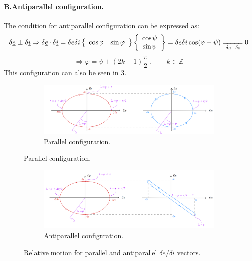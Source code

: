 			\paragraph{\textcolor{GMVred}{B.}Antiparallel configuration. \\}
			\indent The condition for antiparallel configuration can be expressed as:
			\[
			\delta\underline{e} \perp \delta \underline{i} \Rightarrow \delta \underline{e} \cdot \delta\underline{i} = \delta e \delta i \left\{ \begin{array}{cc}
			\cos\varphi & \sin\varphi
			\end{array}\right\}
			\left\{ \begin{array}{c}
			\cos\psi\\
			\sin\psi
			\end{array}\right\} =  \delta e \delta i \cos (\varphi - \psi) \xlongequal[\delta\underline{e} \perp \delta \underline{i}]{} 0
			\]
			\begin{equation}
			\label{eqCh2:Antiparallel_ei}\Longrightarrow \varphi = \psi + (2k+1)\frac{\pi}{2}\; , \qquad k \in \mathbb{Z}
			\end{equation}
			\indent This configuration can also be seen in \ref{figCh2:Antiparallel}.
			\begin{figure}[ht]
			\centering
			\medskip
			\begin{subfigure}[t]{.9\linewidth}
			\centering\includegraphics[width=\linewidth]{Chapters/Chapter_02/E_I_parallel}
			\caption{Parallel configuration.}
			\label{figCh2:Parallel}
			\end{subfigure}
			\end{figure}
			\begin{figure}
			\ContinuedFloat
			\begin{subfigure}[t]{.9\linewidth}
			\centering\includegraphics[width=\linewidth]{Chapters/Chapter_02/E_I_antiparallel}
			\caption{Antiparallel configuration.}
			\label{figCh2:Antiparallel}
			\end{subfigure}
			\caption{Relative motion for parallel and antiparallel $\delta \underline{e}/\delta\underline{i}$ vectors.}
			\label{fig:E_I_par_anti}
			\end{figure}
			\FloatBarrier
